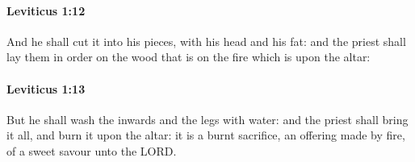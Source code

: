 		\paragraph{Leviticus 1:12} %
			\label{LEVITICUS-1-12}

			And he shall cut it into his pieces, with his head and his fat: and the priest shall lay them in order on the wood that is on the fire which is upon the altar:


		\paragraph{Leviticus 1:13} %
			\label{LEVITICUS-1-13}

			But he shall wash the inwards and the legs with water: and the priest shall bring it all, and burn it upon the altar: it is a burnt sacrifice, an offering made by fire, of a sweet savour unto the LORD.


